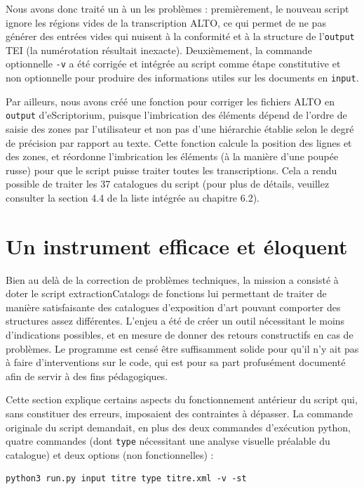 \documentclass[a4paper,12pt,twoside]{book}
\begin{document}
Nous avons donc traité un à un les problèmes : premièrement, le nouveau script ignore les régions vides de la transcription ALTO, ce qui permet de ne pas générer des entrées vides qui nuisent à la conformité et à la structure de l'\texttt{output} TEI (la numérotation résultait inexacte). Deuxièmement, la commande optionnelle \texttt{-v} a été corrigée et intégrée au script comme étape constitutive et non optionnelle pour produire des informations utiles sur les documents en \texttt{input}.

Par ailleurs, nous avons créé une fonction pour corriger les fichiers ALTO en \texttt{output} d'eScriptorium, puisque l'imbrication des éléments dépend de l'ordre de saisie des zones par l'utilisateur et non pas d'une hiérarchie établie selon le degré de précision par rapport au texte. Cette fonction calcule la position des lignes et des zones, et réordonne l'imbrication les éléments (à la manière d'une poupée russe) pour que le script puisse traiter toutes les transcriptions. Cela a rendu possible de traiter les 37 catalogues du script  (pour plus de détails, veuillez consulter la section 4.4 de la liste intégrée au chapitre 6.2).



\section{Un instrument efficace et éloquent}

Bien au delà de la correction de problèmes techniques, la mission a consisté à doter le script extractionCatalogs de fonctions lui permettant de traiter de manière satisfaisante des catalogues d'exposition d'art pouvant comporter des structures assez différentes. L'enjeu a été de créer un outil nécessitant le moins d'indications possibles, et en mesure de donner des retours constructifs en cas de problèmes. Le programme est censé être suffisamment solide pour qu'il n'y ait pas à faire d'interventions sur le code, qui est pour sa part profusément documenté afin de servir à des fins pédagogiques. 

Cette section explique certains aspects du fonctionnement antérieur du script qui, sans constituer des erreurs, imposaient des contraintes à dépasser. La commande originale du script demandait, en plus des deux commandes d'exécution python, quatre commandes (dont \texttt{type} nécessitant une analyse visuelle préalable du catalogue) et deux options (non fonctionnelles) : 
\begin{normalsize}
	\begin{verbatim}
python3 run.py input titre type titre.xml -v -st
	\end{verbatim}
\end{normalsize}
\end{document}
